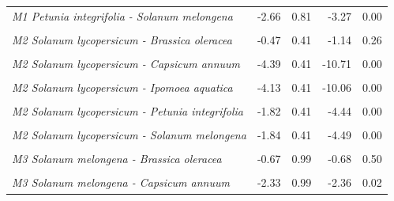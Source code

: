 \documentclass[12pt,]{article}
\begin{document}
\begin{longtable}[t]{>{}lrrrr}
\addlinespace
\em{M1 Petunia integrifolia - Solanum melongena} & -2.66 & 0.81 & -3.27 & 0.00\\
\addlinespace
\em{\cellcolor{gray!6}{M2 Solanum lycopersicum - (Intercept)}} & \cellcolor{gray!6}{4.39} & \cellcolor{gray!6}{0.24} & \cellcolor{gray!6}{18.54} & \cellcolor{gray!6}{0.00}\\
\addlinespace
\em{M2 Solanum lycopersicum - Brassica oleracea} & -0.47 & 0.41 & -1.14 & 0.26\\
\addlinespace
\em{\cellcolor{gray!6}{M2 Solanum lycopersicum - Brassica rapa}} & \cellcolor{gray!6}{-2.74} & \cellcolor{gray!6}{0.41} & \cellcolor{gray!6}{-6.67} & \cellcolor{gray!6}{0.00}\\
\addlinespace
\em{M2 Solanum lycopersicum - Capsicum annuum} & -4.39 & 0.41 & -10.71 & 0.00\\
\addlinespace
\em{\cellcolor{gray!6}{M2 Solanum lycopersicum - Eruca vesicaria}} & \cellcolor{gray!6}{-2.97} & \cellcolor{gray!6}{0.41} & \cellcolor{gray!6}{-7.25} & \cellcolor{gray!6}{0.00}\\
\addlinespace
\em{M2 Solanum lycopersicum - Ipomoea aquatica} & -4.13 & 0.41 & -10.06 & 0.00\\
\addlinespace
\em{\cellcolor{gray!6}{M2 Solanum lycopersicum - Ipomoea purpurea}} & \cellcolor{gray!6}{-3.80} & \cellcolor{gray!6}{0.41} & \cellcolor{gray!6}{-9.27} & \cellcolor{gray!6}{0.00}\\
\addlinespace
\em{M2 Solanum lycopersicum - Petunia integrifolia} & -1.82 & 0.41 & -4.44 & 0.00\\
\addlinespace
\em{\cellcolor{gray!6}{M2 Solanum lycopersicum - Sinapis alba}} & \cellcolor{gray!6}{-3.72} & \cellcolor{gray!6}{0.41} & \cellcolor{gray!6}{-9.08} & \cellcolor{gray!6}{0.00}\\
\addlinespace
\em{M2 Solanum lycopersicum - Solanum melongena} & -1.84 & 0.41 & -4.49 & 0.00\\
\addlinespace
\em{\cellcolor{gray!6}{M3 Solanum melongena - (Intercept)}} & \cellcolor{gray!6}{6.34} & \cellcolor{gray!6}{0.70} & \cellcolor{gray!6}{9.09} & \cellcolor{gray!6}{0.00}\\
\addlinespace
\em{M3 Solanum melongena - Brassica oleracea} & -0.67 & 0.99 & -0.68 & 0.50\\
\addlinespace
\em{\cellcolor{gray!6}{M3 Solanum melongena - Brassica rapa}} & \cellcolor{gray!6}{-4.33} & \cellcolor{gray!6}{0.99} & \cellcolor{gray!6}{-4.39} & \cellcolor{gray!6}{0.00}\\
\addlinespace
\em{M3 Solanum melongena - Capsicum annuum} & -2.33 & 0.99 & -2.36 & 0.02\\

\end{longtable}
\end{document}
